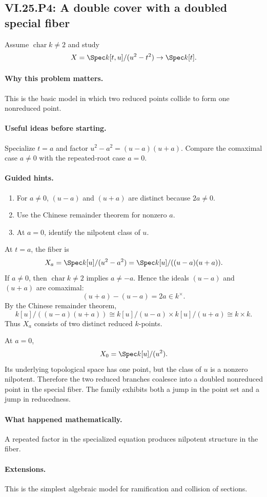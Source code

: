 \subsection*{VI.25.P4: A double cover with a doubled special fiber}
\begin{problem}\label{prob:vi25-p04}
Assume \(\operatorname{char}k\ne2\) and study
\[
X=\Spec k[t,u]/(u^2-t^2)\to\Spec k[t].
\]
\end{problem}

\ifdefined\FullProblemDossiers
\paragraph{Why this problem matters.}
This is the basic model in which two reduced points collide to form one nonreduced point.

\paragraph{Useful ideas before starting.}
Specialize \(t=a\) and factor \(u^2-a^2=(u-a)(u+a)\).  Compare the comaximal case \(a\ne0\) with the repeated-root case \(a=0\).

\paragraph{Guided hints.}
\begin{enumerate}
\item For \(a\ne0\), \((u-a)\) and \((u+a)\) are distinct because \(2a\ne0\).
\item Use the Chinese remainder theorem for nonzero \(a\).
\item At \(a=0\), identify the nilpotent class of \(u\).
\end{enumerate}

\begin{solution}
At \(t=a\), the fiber is
\[
X_a=\Spec k[u]/(u^2-a^2)
=
\Spec k[u]/((u-a)(u+a)).
\]
If \(a\ne0\), then \(\operatorname{char}k\ne2\) implies \(a\ne-a\).  Hence the ideals \((u-a)\) and \((u+a)\) are comaximal:
\[
(u+a)-(u-a)=2a\in k^\times.
\]
By the Chinese remainder theorem,
\[
k[u]/((u-a)(u+a))
\cong
k[u]/(u-a)\times k[u]/(u+a)
\cong
k\times k.
\]
Thus \(X_a\) consists of two distinct reduced \(k\)-points.

At \(a=0\),
\[
X_0=\Spec k[u]/(u^2).
\]
Its underlying topological space has one point, but the class of \(u\) is a nonzero nilpotent.  Therefore the two reduced branches coalesce into a doubled nonreduced point in the special fiber.  The family exhibits both a jump in the point set and a jump in reducedness.
\end{solution}

\paragraph{What happened mathematically.}
A repeated factor in the specialized equation produces nilpotent structure in the fiber.

\paragraph{Extensions.}
This is the simplest algebraic model for ramification and collision of sections.
\fi
